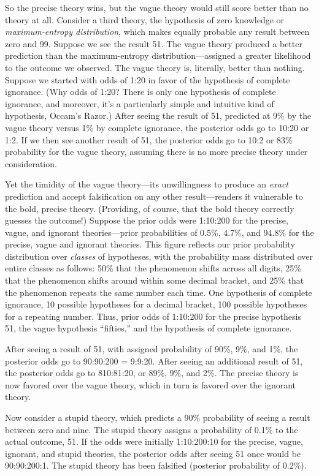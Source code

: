 {
 So the precise theory wins, but the vague theory would still score
better than no theory at all. Consider a third theory, the hypothesis
of zero knowledge or \textit{maximum-entropy distribution}, which makes
equally probable any result between zero and 99. Suppose we see the
result 51. The vague theory produced a better prediction than the
maximum-entropy distribution---assigned a greater likelihood to the
outcome we observed. The vague theory is, literally, better than
nothing. Suppose we started with odds of 1:20 in favor of the
hypothesis of complete ignorance. (Why odds of 1:20? There is only one
hypothesis of complete ignorance, and moreover, it's a
particularly simple and intuitive kind of hypothesis,
Occam's Razor.) After seeing the result of 51,
predicted at 9\% by the vague theory versus 1\% by complete ignorance,
the posterior odds go to 10:20 or 1:2. If we then see another result of
51, the posterior odds go to 10:2 or 83\% probability for the vague
theory, assuming there is no more precise theory under consideration.}

{
 Yet the timidity of the vague theory---its unwillingness to
produce an \textit{exact} prediction and accept falsification on any
other result---renders it vulnerable to the bold, precise theory.
(Providing, of course, that the bold theory correctly guesses the
outcome!) Suppose the prior odds were 1:10:200 for the precise, vague,
and ignorant theories---prior probabilities of 0.5\%, 4.7\%, and 94.8\%
for the precise, vague and ignorant theories. This figure reflects our
prior probability distribution over \textit{classes} of hypotheses,
with the probability mass distributed over entire classes as follows:
50\% that the phenomenon shifts across all digits, 25\% that the
phenomenon shifts around within some decimal bracket, and 25\% that the
phenomenon repeats the same number each time. One hypothesis of
complete ignorance, 10 possible hypotheses for a decimal bracket, 100
possible hypotheses for a repeating number. Thus, prior odds of
1:10:200 for the precise hypothesis 51, the vague hypothesis
``fifties,'' and the hypothesis of
complete ignorance.}

{
 After seeing a result of 51, with assigned probability of 90\%,
9\%, and 1\%, the posterior odds go to 90:90:200 = 9:9:20. After seeing
an additional result of 51, the posterior odds go to 810:81:20, or
89\%, 9\%, and 2\%. The precise theory is now favored over the vague
theory, which in turn is favored over the ignorant theory.}

{
 Now consider a stupid theory, which predicts a 90\% probability of
seeing a result between zero and nine. The stupid theory assigns a
probability of 0.1\% to the actual outcome, 51. If the odds were
initially 1:10:200:10 for the precise, vague, ignorant, and stupid
theories, the posterior odds after seeing 51 once would be 90:90:200:1.
The stupid theory has been falsified (posterior probability of 0.2\%).}

